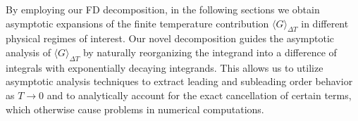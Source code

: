 \documentclass[sn-mathphys,Numbered]{sn-jnl}
\begin{document}
By employing our FD decomposition, in the following sections we obtain asymptotic expansions of the finite temperature contribution $\langle G\rangle_{\Delta T}$ in different physical regimes of interest. Our novel decomposition guides the asymptotic analysis of $\langle G\rangle_{\Delta T}$ by naturally reorganizing the integrand into a difference of integrals with exponentially decaying integrands. This allows us to utilize asymptotic analysis techniques to extract leading and subleading order behavior as $T\to 0$ and to analytically account for the exact cancellation of certain terms, which otherwise cause problems in numerical computations. 









\end{document}
